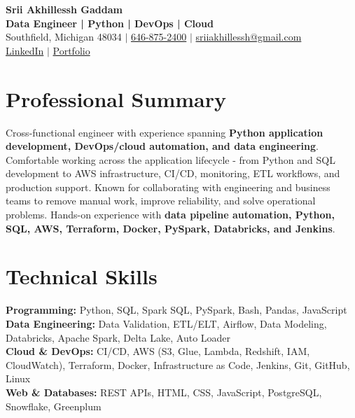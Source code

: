 \documentclass[letterpaper,10pt]{article}
\begin{document}
\fontsize{9.35pt}{10.45pt}\selectfont

\begin{center}
    {\LARGE \textbf{Srii Akhillessh Gaddam}} \\[-1pt]
    \textbf{Data Engineer | Python | DevOps | Cloud} \\[2pt]
    Southfield, Michigan 48034 $|$
    \href{tel:6468752400}{646-875-2400} $|$
    \href{mailto:sriiakhillessh@gmail.com}{sriiakhillessh@gmail.com} \\[1pt]
    \href{https://www.linkedin.com/in/srii-akhiilessh-gaddam-b48668191/}{LinkedIn} $|$
    \href{https://sriiakhillesshg.github.io/portfolio/}{Portfolio}
\end{center}
\vspace{-8pt}

\section{Professional Summary}
\small{Cross-functional engineer with experience spanning \textbf{Python application development, DevOps/cloud automation, and data engineering}. Comfortable working across the application lifecycle - from Python and SQL development to AWS infrastructure, CI/CD, monitoring, ETL workflows, and production support. Known for collaborating with engineering and business teams to remove manual work, improve reliability, and solve operational problems. Hands-on experience with \textbf{data pipeline automation, Python, SQL, AWS, Terraform, Docker, PySpark, Databricks, and Jenkins}.}

\section{Technical Skills}
\small{
\textbf{Programming:} Python, SQL, Spark SQL, PySpark, Bash, Pandas, JavaScript \\
\textbf{Data Engineering:} Data Validation, ETL/ELT, Airflow, Data Modeling, Databricks, Apache Spark, Delta Lake, Auto Loader \\
\textbf{Cloud \& DevOps:} CI/CD, AWS (S3, Glue, Lambda, Redshift, IAM, CloudWatch), Terraform, Docker, Infrastructure as Code, Jenkins, Git, GitHub, Linux \\
\textbf{Web \& Databases:} REST APIs, HTML, CSS, JavaScript, PostgreSQL, Snowflake, Greenplum
}
\end{document}
